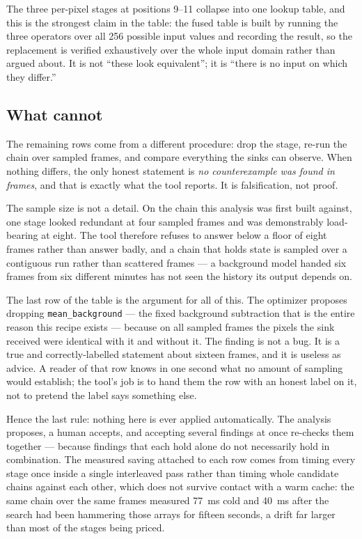 The three per-pixel stages at positions 9--11 collapse into one lookup table, and
this is the strongest claim in the table: the fused table is built by running the
three operators over all 256 possible input values and recording the result, so
the replacement is verified exhaustively over the whole input domain rather than
argued about. It is not ``these look equivalent''; it is ``there is no input on which
they differ.''

\subsection{What cannot}

The remaining \OptSampled{} rows come from a different procedure: drop the stage,
re-run the chain over \OptFrames{} sampled frames, and compare everything the
sinks can observe. When nothing differs, the only honest statement is
\emph{no counterexample was found in \OptFrames{} frames}, and that is exactly
what the tool reports. It is falsification, not proof.

The sample size is not a detail. On the chain this analysis was first built
against, one stage looked redundant at four sampled frames and was demonstrably
load-bearing at eight. The tool therefore refuses to answer below a floor of
eight frames rather than answer badly, and a chain that holds state is sampled
over a contiguous run rather than scattered frames --- a background model handed
six frames from six different minutes has not seen the history its output
depends on.

The last row of the table is the argument for all of this. The optimizer proposes
dropping \texttt{mean\_background} --- the fixed background subtraction that is
the entire reason this recipe exists --- because on all \OptFrames{} sampled
frames the pixels the sink received were identical with it and without it. The
finding is not a bug. It is a true and correctly-labelled statement about sixteen
frames, and it is useless as advice. A reader of that row knows in one second
what no amount of sampling would establish; the tool's job is to hand them the
row with an honest label on it, not to pretend the label says something else.

Hence the last rule: nothing here is ever applied automatically. The analysis
proposes, a human accepts, and accepting several findings at once re-checks them
together --- because findings that each hold alone do not necessarily hold in
combination. The measured saving attached to each row comes from timing every
stage once inside a single interleaved pass rather than timing whole candidate
chains against each other, which does not survive contact with a warm cache: the
same chain over the same frames measured 77~ms cold and 40~ms after the search
had been hammering those arrays for fifteen seconds, a drift far larger than most
of the stages being priced.
